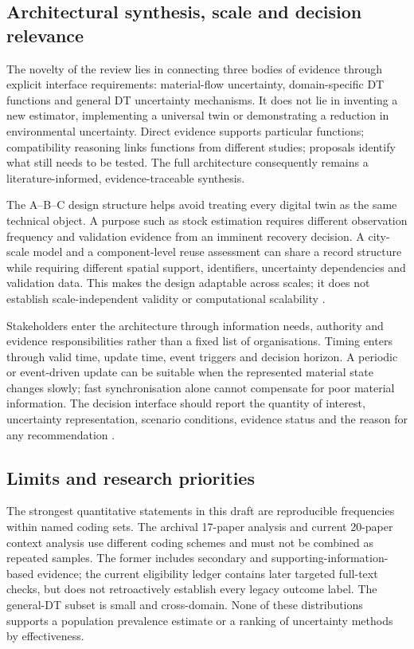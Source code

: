 \subsection{Architectural synthesis, scale and decision relevance}
The novelty of the review lies in connecting three bodies of evidence through explicit interface requirements: material-flow uncertainty, domain-specific DT functions and general DT uncertainty mechanisms. It does not lie in inventing a new estimator, implementing a universal twin or demonstrating a reduction in environmental uncertainty. Direct evidence supports particular functions; compatibility reasoning links functions from different studies; proposals identify what still needs to be tested. The full architecture consequently remains a literature-informed, evidence-traceable synthesis.

The A–B–C design structure helps avoid treating every digital twin as the same technical object. A purpose such as stock estimation requires different observation frequency and validation evidence from an imminent recovery decision. A city-scale model and a component-level reuse assessment can share a record structure while requiring different spatial support, identifiers, uncertainty dependencies and validation data. This makes the design adaptable across scales; it does not establish scale-independent validity or computational scalability \citep{R1,R5}.

Stakeholders enter the architecture through information needs, authority and evidence responsibilities rather than a fixed list of organisations. Timing enters through valid time, update time, event triggers and decision horizon. A periodic or event-driven update can be suitable when the represented material state changes slowly; fast synchronisation alone cannot compensate for poor material information. The decision interface should report the quantity of interest, uncertainty representation, scenario conditions, evidence status and the reason for any recommendation \citep{R5,R6}.

\subsection{Limits and research priorities}
The strongest quantitative statements in this draft are reproducible frequencies within named coding sets. The archival 17-paper analysis and current 20-paper context analysis use different coding schemes and must not be combined as repeated samples. The former includes secondary and supporting-information-based evidence; the current eligibility ledger contains later targeted full-text checks, but does not retroactively establish every legacy outcome label. The general-DT subset is small and cross-domain. None of these distributions supports a population prevalence estimate or a ranking of uncertainty methods by effectiveness.

